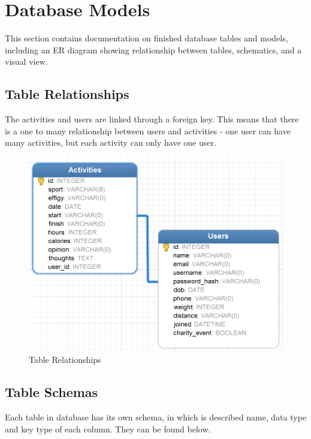 \documentclass{article}[12pt,a4paper]
\begin{document}
\section{Database Models}
This section contains documentation on finished database tables and models, including an ER diagram showing relationship between tables, schematics, and a visual view.

\subsection{Table Relationships}
The activities and users are linked through a foreign key. This means that there is a one to many relationship between users and activities - one user can have many activities, but each activity can only have one user.

\begin{figure}[h!]
  \includegraphics[scale=0.5]{images/database/er_diagram}
  \caption{Table Relationships}
\end{figure}

\clearpage

\subsection{Table Schemas}
Each table in database has its own schema, in which is described name, data type and key type of each column. They can be found below.
\end{document}

